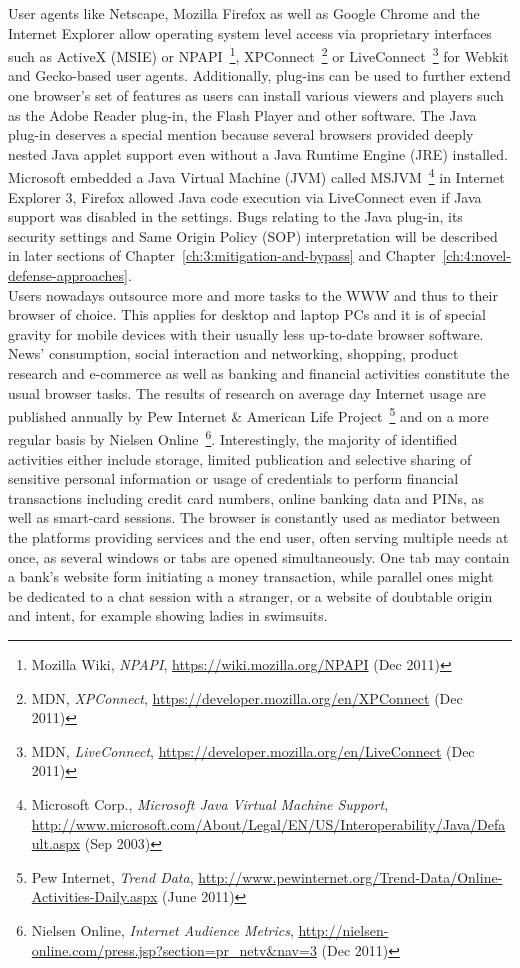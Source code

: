   User agents like Netscape, Mozilla Firefox as well as Google Chrome and the Internet Explorer allow operating system level access via proprietary interfaces such as ActiveX (MSIE) or NPAPI~\footnote{Mozilla Wiki, \textit{NPAPI}, \url{https://wiki.mozilla.org/NPAPI} (Dec 2011)}, XPConnect~\footnote{MDN, \textit{XPConnect}, \url{https://developer.mozilla.org/en/XPConnect} (Dec 2011)} or LiveConnect~\footnote{MDN, \textit{LiveConnect}, \url{https://developer.mozilla.org/en/LiveConnect} (Dec 2011)} for Webkit and Gecko-based user agents. Additionally, plug-ins can be used to further extend one browser's set of features as users can install various viewers and players such as the Adobe Reader plug-in, the Flash Player and other software. The Java plug-in deserves a special mention because several browsers provided deeply nested Java applet support even without a Java Runtime Engine (JRE) installed. Microsoft embedded a Java Virtual Machine (JVM) called MSJVM~\footnote{Microsoft Corp., \textit{Microsoft Java 
Virtual Machine Support}, \url{http://www.microsoft.com/About/Legal/EN/US/Interoperability/Java/Default.aspx} (Sep 2003)} in Internet Explorer 3, Firefox allowed Java code execution via LiveConnect even if Java support was disabled in the settings. Bugs relating to the Java plug-in, its security settings and Same Origin Policy (SOP) interpretation will be described in later sections of Chapter~\ref{ch:3:mitigation-and-bypass} and Chapter~\ref{ch:4:novel-defense-approaches}.\\ 

  Users nowadays outsource more and more tasks to the WWW and thus to their browser of choice. This applies for desktop and laptop PCs and it is of special gravity for mobile devices with their usually less up-to-date browser software. News' consumption, social interaction and networking, shopping, product research and e-commerce as well as banking and financial activities constitute the usual browser tasks. The results of research on average day Internet usage are published annually by Pew Internet \& American Life Project~\footnote{Pew Internet, \textit{Trend Data}, \url{http://www.pewinternet.org/Trend-Data/Online-Activities-Daily.aspx} (June 2011)} and on a more regular basis by Nielsen Online~\footnote{Nielsen Online, \textit{Internet Audience Metrics}, \url{http://nielsen-online.com/press.jsp?section=pr_netv&nav=3} (Dec 2011)}. Interestingly, the majority of identified activities either include storage, limited publication and selective sharing of sensitive personal information or usage of credentials 
to perform financial transactions including credit card numbers, online banking data and PINs, as well as smart-card sessions.  The browser is constantly used as mediator between the platforms providing services and the end user, often serving multiple needs at once, as several windows or tabs are opened simultaneously. One tab may contain a bank's website form initiating a money transaction, while parallel ones might be dedicated to a chat session with a stranger, or a website of doubtable origin and intent, for example showing ladies in swimsuits. \\

